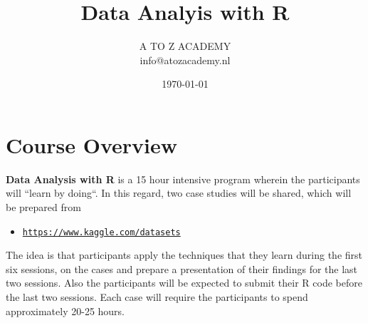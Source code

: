 \documentclass[15pt]{book}\usepackage[]{graphicx}\usepackage[]{color}
\title{\Huge{Data Analyis with R}}
\author{\Large{A TO Z ACADEMY} \\
            {info@atozacademy.nl}
}
\date{\today}
\begin{document}
\maketitle
\cleardoublepage
\chapter*{Course Overview}
\noindent \textbf{Data Analysis with R} is a 15 hour intensive program wherein the participants will ``learn by doing``. In this regard, two case studies will be shared, which will be prepared from\\ 
  \begin{itemize}
    \item  \texttt{\url{https://www.kaggle.com/datasets}}
  \end{itemize}
\noindent The idea is that participants apply the techniques that they learn during the first six sessions, on the cases and prepare a presentation of their findings for the last two sessions. Also the participants will be expected to submit their R code before the last two sessions. Each case will require the participants to spend approximately 20-25 hours.\\

\end{document}
